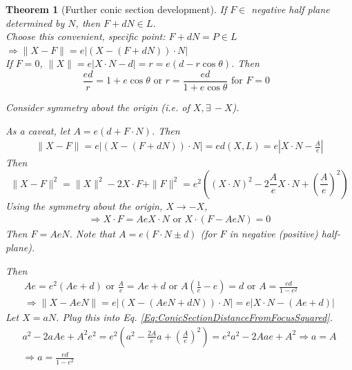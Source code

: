 \documentclass[10pt]{amsart}
\newtheorem{theorem}{Theorem}
\begin{document}
\begin{multicols*}{2}
\begin{theorem}[Further conic section development]
	If $F \in $ negative half plane determined by $N$, then $F + dN \in L$. \\
	
Choose this convenient, specific point: $ F + dN = P \in L$ \quad \, $\Longrightarrow \| X - F \| = e |(X - (F + dN))\cdot N |$ \\

If $F = 0$, $\| X \| = e| X\cdot N - d | = r = e(d - r\cos{\theta})$. Then
\begin{equation}\label{Eq:ConicSectionEqWithCenterAtFocus}
\frac{ed}{r} = 1 + e \cos{\theta} \text{ or } \boxed{ r = \frac{ed }{ 1 + e\cos{\theta}} } \text{ for $F = 0$ }
\end{equation}	

Consider symmetry about the origin (i.e. of $X, \exists \, -X$). 

As a caveat, let $A = e(d + F\cdot N)$. Then
\[
\begin{gathered}
	\| X - F \| = e | (X - (F + dN )) \cdot N | = e d(X, L) = e | X \cdot N - \frac{A}{e} | 
\end{gathered}
\]
Then
\begin{equation}\label{Eq:ConicSectionDistanceFromFocusSquared}
\| X - F \|^2 = \| X \|^2 - 2 X\cdot F + \| F \|^2 = e^2 ((X\cdot N)^2 - 2 \frac{A}{e} X\cdot N + \left( \frac{A}{e}\right)^2 )
\end{equation}
Using the symmetry about the origin, $X \to -X$, \\
\[
\begin{gathered}
	\Longrightarrow X\cdot F = Ae X\cdot N \text{ or } X \cdot (F - Ae N) = 0
\end{gathered}
\]
Then $F = AeN$. Note that $A = e(F\cdot N \pm d)$ (for $F$ in negative (positive) half-plane). 

Then
\[
\begin{gathered}
Ae = e^2 ( Ae + d) \text{ or } \frac{A}{e} = Ae + d \text{ or } A \left( \frac{1}{e} - e \right) = d \text{ or } A = \frac{ed}{1 - e^2 } \\
\Longrightarrow \| X - Ae N \| = e| (X - (AeN + dN)) \cdot N | = e|X\cdot N - (Ae + d) |
\end{gathered}
\]
Let $X = aN$. Plug this into Eq. \ref{Eq:ConicSectionDistanceFromFocusSquared}.
\begin{equation}\label{Eq:SemiMajorAxis}
\begin{gathered} 
a^2 - 2aA e + A^2 e^2 = e^2 (a^2 - \frac{2A}{e} a + \left( \frac{A}{e} \right)^2 ) = e^2 a^2 - 2Aae + A^2 \Longrightarrow a = A \\
\Longrightarrow a = \frac{ed}{1 - e^2 }
\end{gathered} 
\end{equation}


\end{theorem}
\end{multicols*}
\end{document}
